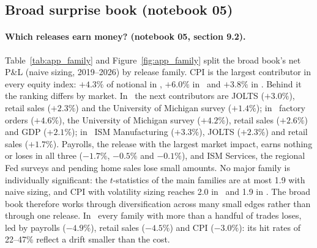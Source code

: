 \FloatBarrier
\subsection{Broad surprise book (notebook 05)}

\paragraph{Which releases earn money? (notebook 05, section 9.2).} Table~\ref{tab:app_family} and
Figure~\ref{fig:app_family} split the broad book's net P\&L (naive sizing, 2019--2026) by release
family. CPI is the largest contributor in every equity index: $+4.3\%$ of notional in \ES, $+6.0\%$
in \NQ\ and $+3.8\%$ in \YM. Behind it the ranking differs by market. In \ES\ the next contributors are
JOLTS ($+3.0\%$), retail sales ($+2.3\%$) and the University of Michigan survey ($+1.4\%$); in \NQ\
factory orders ($+4.6\%$), the University of Michigan survey ($+4.2\%$), retail sales ($+2.6\%$) and
GDP ($+2.1\%$); in \YM\ ISM Manufacturing ($+3.3\%$), JOLTS ($+2.3\%$) and retail sales ($+1.7\%$).
Payrolls, the release with the largest market impact, earns nothing or loses in all three ($-1.7\%$,
$-0.5\%$ and $-0.1\%$), and ISM Services, the regional Fed surveys and pending home sales lose small
amounts. No major family is individually significant: the $t$-statistics of the main families are at
most 1.9 with naive sizing, and CPI with volatility sizing reaches 2.0 in \ES\ and 1.9 in \NQ. The broad book
therefore works through diversification across many small edges rather than through one release.
In \ZN\ every family with more than a handful of trades loses, led by payrolls ($-4.9\%$), retail
sales ($-4.5\%$) and CPI ($-3.0\%$): its hit rates of 22--47\% reflect a drift smaller than the cost.

